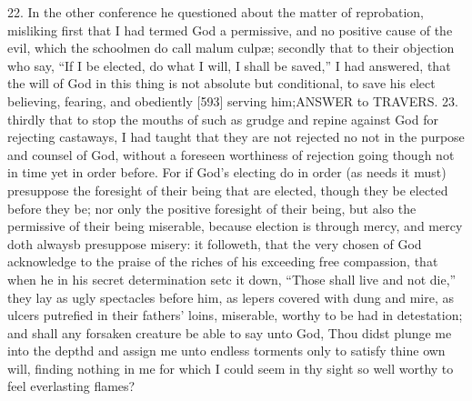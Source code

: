 22. In the other conference he questioned about the matter of reprobation, misliking first that I had termed God a permissive, and no positive cause of the evil, which the schoolmen do call malum culpæ; secondly that to their objection who say, “If I be elected, do what I will, I shall be saved,” I had answered, that the will of God in this thing is not absolute but conditional, to save his elect believing, fearing, and obediently [593] serving him;ANSWER to TRAVERS. 23. thirdly that to stop the mouths of such as grudge and repine against God for rejecting castaways, I had taught that they are not rejected no not in the purpose and counsel of God, without a foreseen worthiness of rejection going though not in time yet in order before. For if God’s electing do in order (as needs it must) presuppose the foresight of their being that are elected, though they be elected before they be; nor only the positive foresight of their being, but also the permissive of their being miserable, because election is through mercy, and mercy doth alwaysb presuppose misery: it followeth, that the very chosen of God acknowledge to the praise of the riches of his exceeding free compassion, that when he in his secret determination setc it down, “Those shall live and not die,” they lay as ugly spectacles before him, as lepers covered with dung and mire, as ulcers putrefied in their fathers’ loins, miserable, worthy to be had in detestation; and shall any forsaken creature be able to say unto God, Thou didst plunge me into the depthd and assign me unto endless torments only to satisfy thine own will, finding nothing in me for which I could seem in thy sight so well worthy to feel everlasting flames?

